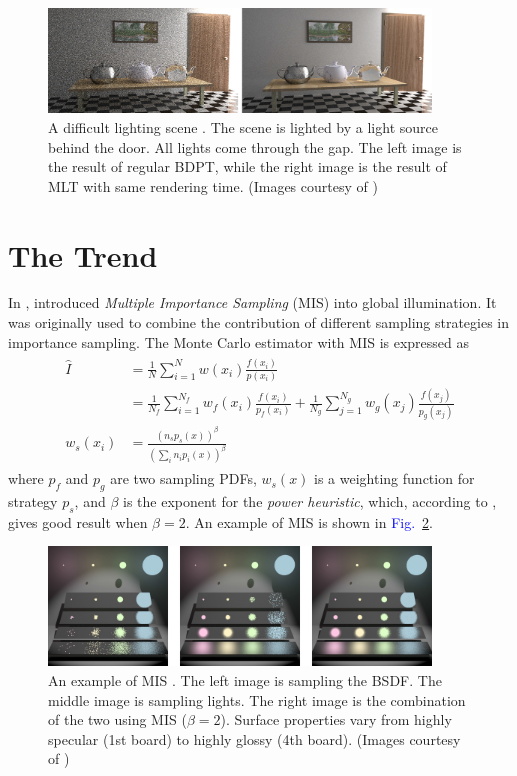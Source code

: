 \documentclass[]{book}
\renewcommand{\figurename}{\textcolor{blue}{Fig.\ }}
\begin{document}
\begin{figure}
	\centering
	\includegraphics[width=4.0in]{img/GI-MLT.png}
	\caption[Metropolis Light Transport]{A difficult lighting scene \cite{veach1997robust}. The scene is lighted by a light source behind the door. All lights come through the gap. The left image is the result of regular BDPT, while the right image is the result of MLT with same rendering time. (Images courtesy of \citeauthor{veach1997robust})}
	\label{fig:GI:MLT}
\end{figure}

\section{The Trend}
\label{sec:GI:trend}
In \citeyear{veach1995MIS}, \citeauthor{veach1995MIS} introduced \textit{Multiple Importance Sampling} (MIS) into global illumination.
It was originally used to combine the contribution of different sampling strategies in importance sampling.
The Monte Carlo estimator with MIS is expressed as
\begin{gather}
\begin{aligned}
\widehat{I} &= \frac{1}{N} \sum_{i = 1}^{N} w(x_i) \frac{f(x_i)}{p(x_i)} \\
&= \frac{1}{N_f} \sum_{i = 1}^{N_f}w_f(x_i)\frac{f(x_i)}{p_f(x_i)} + \frac{1}{N_g} \sum_{j = 1}^{N_g} w_g(x_j)\frac{f(x_j)}{p_g(x_j)} \\
w_s(x_i) &= \frac{ (n_s p_s (x))^\beta}{(\sum_i n_i p_i (x))^\beta}
\end{aligned}
\label{eq:GI:MIS}
\end{gather}
where $p_f$ and $p_g$ are two sampling PDFs, $w_s(x)$ is a weighting function for strategy $p_s$, and $\beta$ is the exponent for the \textit{power heuristic}, which, according to \citeauthor{veach1995MIS}, gives good result when $\beta = 2$.
An example of MIS is shown in \figurename \ref{fig:GI:MIS}.

\begin{figure}[b]
	\centering\includegraphics[width=4.0in]{img/GI-MIS.png}
	\caption[Multiple Importance Sampling]{An example of MIS \cite{veach1995MIS}. The left image is sampling the BSDF. The middle image is sampling lights. The right image is the combination of the two using MIS ($\beta = 2$). Surface properties vary from highly specular (1st board) to highly glossy (4th board). (Images courtesy of \citeauthor{veach1997robust})}
	\label{fig:GI:MIS}
\end{figure}
\end{document}
